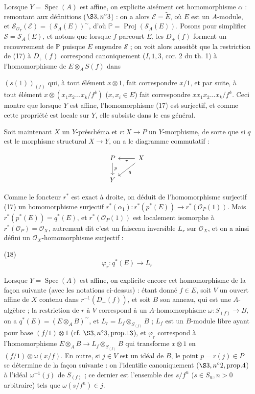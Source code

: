 Lorsque $Y=\operatorname{Spec}(A)$ est affine, on explicite aisément cet homomorphisme $\alpha$ : remontant aux définitions ($\S 3, n^\circ 3$) : on a alors $\mathcal{E}=\tilde{E}$, où $E$ est un $A$-module, et $\mathcal{S}_{\mathcal{O}_Y}(\mathcal{E})=(\mathcal{S}_A(E))^{\sim}$, d'où $\mathbb{P}=\operatorname{Proj}(\mathcal{S}_A(E))$. Posons pour simplifier $\mathcal{S}=\mathcal{S}_A(E)$, et notons que lorsque $f$ parcourt $E$, les $D_+(f)$ forment un recouvrement de $\mathbb{P}$ puisque $E$ engendre $\mathcal{S}$ ; on voit alors aussitôt que la restriction de (17) à $D_+(f)$ correspond canoniquement ($I, 1, 3$, cor. 2 du th. 1) à l'homomorphisme de $E \otimes_A S(f)$ dans

\newpage


$(s(1))_{(f)}$ qui, à tout élément $x \otimes 1$, fait correspondre $x/1$, et par suite, à tout élément $x \otimes (x_1 x_2 \dots x_k / f^k)$ ($x, x_i \in E$) fait correspondre $xx_1 x_2 \dots x_k / f^k$. Ceci montre que lorsque $Y$ est affine, l'homomorphisme (17) est surjectif, et comme cette propriété est locale sur $Y$, elle subsiste dans le cas général.

Soit maintenant $X$ un $Y$-préschéma et $r : X \to P$ un $Y$-morphisme, de sorte que si $q$ est le morphisme structural $X \to Y$, on a le diagramme commutatif :

$$\begin{tikzcd}
P \arrow[d, "p"] & X \arrow[l, "r"] \arrow[dl, "q"] \\
Y
\end{tikzcd}$$

Comme le foncteur $r^*$ est exact à droite, on déduit de l'homomorphisme surjectif (17) un homomorphisme surjectif $r^*(\alpha_1) : r^*(p^*(E)) \to r^*(\mathcal{O}_P(1))$. Mais $r^*(p^*(E)) = q^*(E)$, et $r^*(\mathcal{O}_P(1))$ est localement isomorphe à $r^*(\mathcal{O}_P) = \mathcal{O}_X$, autrement dit c'est un faisceau inversible $L_r$ sur $\mathcal{O}_X$, et on a ainsi défini un $\mathcal{O}_X$-homomorphisme surjectif :

(18) $$\varphi_r : q^*(E) \to L_r$$

Lorsque $Y = \operatorname{Spec}(A)$ est affine, on explicite encore cet homomorphisme de la façon suivante (avec les notations ci-dessus) : étant donné $f \in E$, soit $V$ un ouvert affine de $X$ contenu dans $r^{-1}(D_+(f))$, et soit $B$ son anneau, qui est une $A$-algèbre ; la restriction de $r$ à $V$ correspond à un $A$-homomorphisme $\omega : S_{(f)} \to B$, on a $q^*(E) = (E \otimes_A B)^\sim$, et $L_r = L_f \otimes_{S_{(f)}} B$ ; $L_f$ est un $B$-module libre ayant pour base $(f/1) \otimes 1$ (cf. $\S 3, n^\circ 3, \text{prop.} 13$), et $\varphi_r$ correspond à l'homomorphisme $E \otimes_A B \to L_f \otimes_{S_{(f)}} B$ qui transforme $x \otimes 1$ en $(f/1) \otimes \omega(x/f)$. En outre, si $j \in V$ est un idéal de $B$, le point $p = r(j) \in P$ se détermine de la façon suivante : on l'identifie canoniquement ($\S 3, n^\circ 2, \text{prop.} 4$) à l'idéal $\omega^{-1}(j)$ de $S_{(f)}$ ; ce dernier est l'ensemble des $s/f^n$ ($s \in S_n, n > 0$ arbitraire) tels que $\omega(s/f^n) \in j$.


